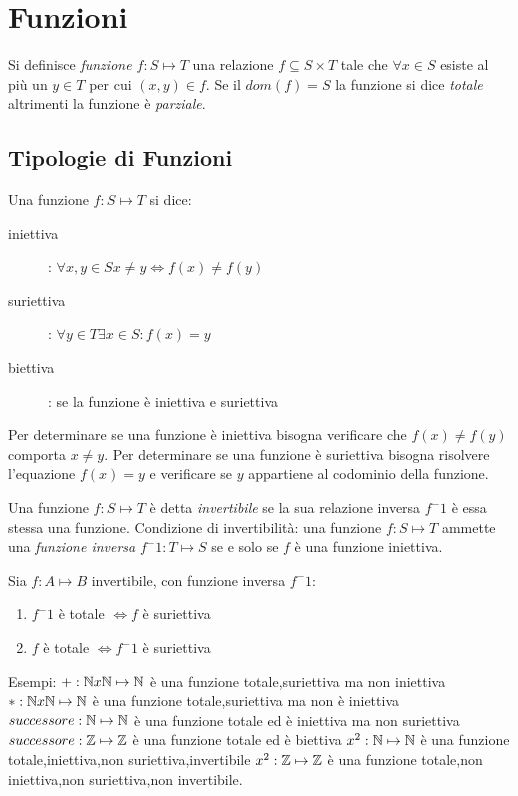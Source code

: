 \chapter{Funzioni}
Si definisce \textit{funzione $f:S \mapsto T$} una relazione $f \subseteq S \times T$
tale che $\forall x \in S$ esiste al più un $y \in T$ per cui $(x,y) \in f$.\newline
Se il $dom(f) = S$ la funzione si dice \emph{totale} altrimenti la funzione è \emph{parziale}.

\section{Tipologie di Funzioni}
Una funzione $f:S \mapsto T$ si dice:
\begin{description}
    \item[iniettiva]: $\forall x,y \in S x \neq y \iff f(x) \neq f(y)$
    \item[suriettiva]: $\forall y \in T \exists x \in S : f(x) = y$
    \item[biettiva]: se la funzione è iniettiva e suriettiva
\end{description}
Per determinare se una funzione è iniettiva bisogna verificare che $f(x) \neq f(y)$
comporta $x \neq y$.
Per determinare se una funzione è suriettiva bisogna risolvere l'equazione $f(x) = y$
e verificare se $y$ appartiene al codominio della funzione.

Una funzione $f:S \mapsto T$ è detta \emph{invertibile} se la sua relazione inversa
$f ^ -1$ è essa stessa una funzione.\newline
Condizione di invertibilità: una funzione $f:S \mapsto T$ ammette una \emph{funzione inversa} $f ^ -1 :T \mapsto S$
se e solo se $f$ è una funzione iniettiva.

\begin{thm}
Sia $f:A \mapsto B$ invertibile, con funzione inversa $f ^ -1$:
\begin{enumerate}
    \item $f^-1$ è totale $\iff f$ è suriettiva
    \item $f$ è totale $\iff f^-1$ è suriettiva
\end{enumerate}
\end{thm}

Esempi:\newline
$+:\mathbb{N} x \mathbb{N} \mapsto \mathbb{N}$ è una funzione totale,suriettiva ma non iniettiva \newline
$*:\mathbb{N} x \mathbb{N} \mapsto \mathbb{N}$ è una funzione totale,suriettiva ma non è iniettiva \newline
$successore:\mathbb{N} \mapsto \mathbb{N}$ è una funzione totale ed è iniettiva ma non suriettiva \newline
$successore:\mathbb{Z} \mapsto \mathbb{Z}$ è una funzione totale ed è biettiva \newline
$x^2:\mathbb{N} \mapsto \mathbb{N}$ è una funzione totale,iniettiva,non suriettiva,invertibile \newline
$x^2:\mathbb{Z} \mapsto \mathbb{Z}$ è una funzione totale,non iniettiva,non suriettiva,non invertibile. \newline

